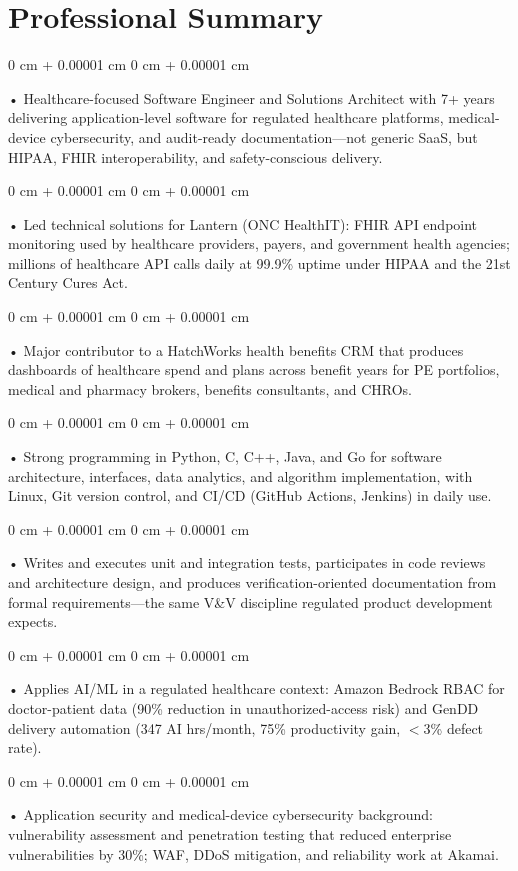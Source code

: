 \documentclass[10pt, letterpaper]{article}
\newenvironment{onecolentry}{
    \begin{adjustwidth}{
        0 cm + 0.00001 cm
    }{
        0 cm + 0.00001 cm
    }
}{
    \end{adjustwidth}
} %
\begin{document}
    \section{Professional Summary}
        \vspace{2 pt }
        \begin{onecolentry}
            • Healthcare-focused Software Engineer and Solutions Architect with 7+ years delivering application-level software for regulated healthcare platforms, medical-device cybersecurity, and audit-ready documentation---not generic SaaS, but HIPAA, FHIR interoperability, and safety-conscious delivery.
        \end{onecolentry}
        \begin{onecolentry}
            • Led technical solutions for Lantern (ONC HealthIT): FHIR API endpoint monitoring used by healthcare providers, payers, and government health agencies; millions of healthcare API calls daily at 99.9\% uptime under HIPAA and the 21st Century Cures Act.
        \end{onecolentry}
        \begin{onecolentry}
            • Major contributor to a HatchWorks health benefits CRM that produces dashboards of healthcare spend and plans across benefit years for PE portfolios, medical and pharmacy brokers, benefits consultants, and CHROs.
        \end{onecolentry}
        \begin{onecolentry}
            • Strong programming in Python, C, C++, Java, and Go for software architecture, interfaces, data analytics, and algorithm implementation, with Linux, Git version control, and CI/CD (GitHub Actions, Jenkins) in daily use.
        \end{onecolentry}
        \begin{onecolentry}
            • Writes and executes unit and integration tests, participates in code reviews and architecture design, and produces verification-oriented documentation from formal requirements---the same V\&V discipline regulated product development expects.
        \end{onecolentry}
        \begin{onecolentry}
            • Applies AI/ML in a regulated healthcare context: Amazon Bedrock RBAC for doctor-patient data (90\% reduction in unauthorized-access risk) and GenDD delivery automation (347 AI hrs/month, 75\% productivity gain, $<$3\% defect rate).
        \end{onecolentry}
        \begin{onecolentry}
            • Application security and medical-device cybersecurity background: vulnerability assessment and penetration testing that reduced enterprise vulnerabilities by 30\%; WAF, DDoS mitigation, and reliability work at Akamai.
        \end{onecolentry}
\end{document}
